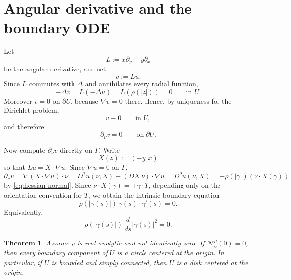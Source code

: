 \documentclass[11pt]{article}
\newtheorem{theorem}{Theorem}[section]
\newcommand{\dd}{\,d}
\newcommand{\1}{\mathbf 1}
\begin{document}
\section{Angular derivative and the boundary ODE}

Let
\[
  L:=x\partial_y-y\partial_x
\]
be the angular derivative, and set
\[
  v:=Lu.
\]
Since \(L\) commutes with \(\Delta\) and annihilates every radial function,
\[
  -\Delta v=L(-\Delta u)=L(\rho(|z|))=0
  \qquad\text{in }U .
\]
Moreover \(v=0\) on \(\partial U\), because \(\nabla u=0\) there.  Hence, by
uniqueness for the Dirichlet problem,
\[
  v\equiv0\qquad\text{in }U,
\]
and therefore
\[
  \partial_\nu v=0\qquad\text{on }\partial U .
\]

Now compute \(\partial_\nu v\) directly on \(\Gamma\).  Write
\[
  X(z):=(-y,x)
\]
so that \(Lu=X\cdot\nabla u\).  Since \(\nabla u=0\) on \(\Gamma\),
\[
  \partial_\nu v
  =
  \nabla(X\cdot\nabla u)\cdot\nu
  =
  D^2u(\nu,X)+(DX\,\nu)\cdot\nabla u
  =
  D^2u(\nu,X)
  =
  -\rho(|\gamma|)(\nu\cdot X(\gamma))
\]
by \eqref{eq:hessian-normal}.  Since \(\nu\cdot X(\gamma)=\pm\gamma\cdot T\),
depending only on the orientation convention for \(T\), we obtain the intrinsic
boundary equation
\begin{equation}\label{eq:boundary-ode}
  \rho(|\gamma(s)|)\,\gamma(s)\cdot\gamma'(s)=0 .
\end{equation}
Equivalently,
\begin{equation}\label{eq:radius-ode}
  \rho(|\gamma(s)|)\frac{\dd}{\dd s}|\gamma(s)|^2=0 .
\end{equation}

\begin{theorem}\label{thm:dtn-to-circle}
Assume \(\rho\) is real analytic and not identically zero.  If
\(\mathcal N_U^\rho(0)=0\), then every boundary component of \(U\) is a circle
centered at the origin.  In particular, if \(U\) is bounded and simply connected,
then \(U\) is a disk centered at the origin.
\end{theorem}
\end{document}
